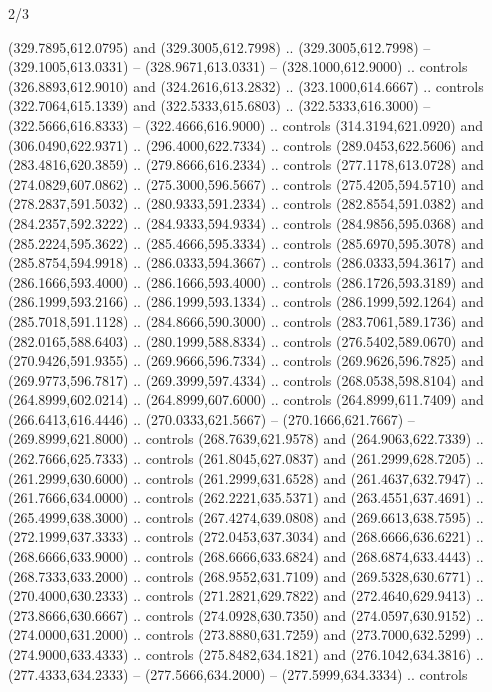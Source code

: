 \begin{flagdescription}{2/3}
\begin{scope}[xshift=0.5\flaglength,yshift=0.5\flagwidth,scale=\flagwidth/525.28]
\begin{scope}[y=0.1mm, x=0.1mm, yscale=-1,shift={(-381.5,-404)}]
\begin{scope}[shift={(5.25001,4.53053)},miter limit=4.00,line width=0.800\lw]
  (329.7895,612.0795) and (329.3005,612.7998) .. (329.3005,612.7998) --
  (329.1005,613.0331) -- (328.9671,613.0331) -- (328.1000,612.9000) .. controls
  (326.8893,612.9010) and (324.2616,613.2832) .. (323.1000,614.6667) .. controls
  (322.7064,615.1339) and (322.5333,615.6803) .. (322.5333,616.3000) --
  (322.5666,616.8333) -- (322.4666,616.9000) .. controls (314.3194,621.0920) and
  (306.0490,622.9371) .. (296.4000,622.7334) .. controls (289.0453,622.5606) and
  (283.4816,620.3859) .. (279.8666,616.2334) .. controls (277.1178,613.0728) and
  (274.0829,607.0862) .. (275.3000,596.5667) .. controls (275.4205,594.5710) and
  (278.2837,591.5032) .. (280.9333,591.2334) .. controls (282.8554,591.0382) and
  (284.2357,592.3222) .. (284.9333,594.9334) .. controls (284.9856,595.0368) and
  (285.2224,595.3622) .. (285.4666,595.3334) .. controls (285.6970,595.3078) and
  (285.8754,594.9918) .. (286.0333,594.3667) .. controls (286.0333,594.3617) and
  (286.1666,593.4000) .. (286.1666,593.4000) .. controls (286.1726,593.3189) and
  (286.1999,593.2166) .. (286.1999,593.1334) .. controls (286.1999,592.1264) and
  (285.7018,591.1128) .. (284.8666,590.3000) .. controls (283.7061,589.1736) and
  (282.0165,588.6403) .. (280.1999,588.8334) .. controls (276.5402,589.0670) and
  (270.9426,591.9355) .. (269.9666,596.7334) .. controls (269.9626,596.7825) and
  (269.9773,596.7817) .. (269.3999,597.4334) .. controls (268.0538,598.8104) and
  (264.8999,602.0214) .. (264.8999,607.6000) .. controls (264.8999,611.7409) and
  (266.6413,616.4446) .. (270.0333,621.5667) -- (270.1666,621.7667) --
  (269.8999,621.8000) .. controls (268.7639,621.9578) and (264.9063,622.7339) ..
  (262.7666,625.7333) .. controls (261.8045,627.0837) and (261.2999,628.7205) ..
  (261.2999,630.6000) .. controls (261.2999,631.6528) and (261.4637,632.7947) ..
  (261.7666,634.0000) .. controls (262.2221,635.5371) and (263.4551,637.4691) ..
  (265.4999,638.3000) .. controls (267.4274,639.0808) and (269.6613,638.7595) ..
  (272.1999,637.3333) .. controls (272.0453,637.3034) and (268.6666,636.6221) ..
  (268.6666,633.9000) .. controls (268.6666,633.6824) and (268.6874,633.4443) ..
  (268.7333,633.2000) .. controls (268.9552,631.7109) and (269.5328,630.6771) ..
  (270.4000,630.2333) .. controls (271.2821,629.7822) and (272.4640,629.9413) ..
  (273.8666,630.6667) .. controls (274.0928,630.7350) and (274.0597,630.9152) ..
  (274.0000,631.2000) .. controls (273.8880,631.7259) and (273.7000,632.5299) ..
  (274.9000,633.4333) .. controls (275.8482,634.1821) and (276.1042,634.3816) ..
  (277.4333,634.2333) -- (277.5666,634.2000) -- (277.5999,634.3334) .. controls

\end{scope}
\end{scope}
\end{scope}
\end{flagdescription}
